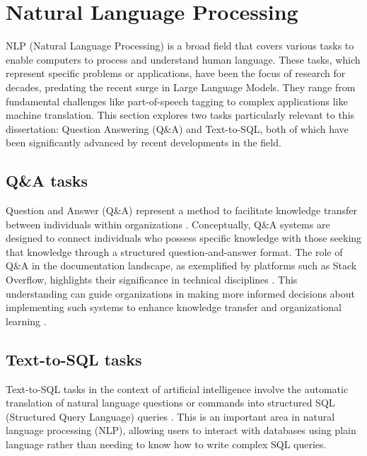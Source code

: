     \section{Natural Language Processing}

        NLP (Natural Language Processing) is a broad field that covers various tasks to enable computers to process and understand human language. These tasks, which represent specific problems or applications, have been the focus of research for decades, predating the recent surge in Large Language Models. They range from fundamental challenges like part-of-speech tagging to complex applications like machine translation. This section explores two tasks particularly relevant to this dissertation: Question Answering (Q\&A) and Text-to-SQL, both of which have been significantly advanced by recent developments in the field.

        \subsection{Q\&A tasks}     

            Question and Answer (Q\&A) represent a method to facilitate knowledge transfer between individuals within organizations \citep{Iske2005}. 
            Conceptually, Q\&A systems are designed to connect individuals who possess specific knowledge with those seeking that knowledge through a structured question-and-answer format. 
            The role of Q\&A in the documentation landscape, as exemplified by platforms such as Stack Overflow, highlights their significance in technical disciplines \citep{Treude2011}. 
            This understanding can guide organizations in making more informed decisions about implementing such systems to enhance knowledge transfer and organizational learning \citep{Iske2005}.

        \subsection{Text-to-SQL tasks} 

            Text-to-SQL tasks in the context of artificial intelligence involve the automatic translation of natural language questions or commands into structured SQL (Structured Query Language) queries \citep{Qin2022}. This is an important area in natural language processing (NLP), allowing users to interact with databases using plain language rather than needing to know how to write complex SQL queries.         
                
